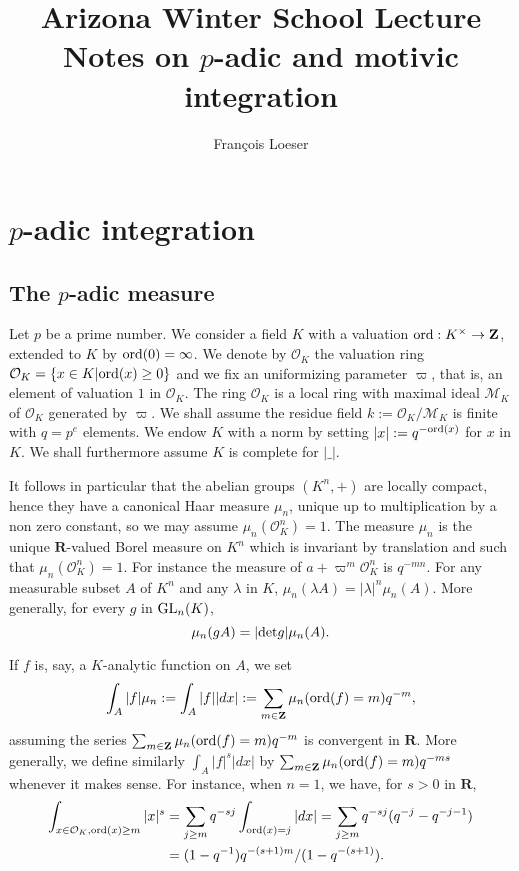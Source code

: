 \documentclass[english,12pt]{amsart}
\author{Fran\c cois Loeser}
\title[$p$-adic and motivic integration]{Arizona Winter School Lecture Notes on 
$p$-adic and motivic integration}
\def\RR{{\mathbf R}}
\def\ZZ{{\mathbf Z}}
\def\cM{{\mathcal M}}
\def\cO{{\mathcal O}}
\theoremstyle{definition}
\theoremstyle{remark}
\theoremstyle{plain}
\numberwithin{equation}{subsection}
\def\RR{{\mathbf R}}
\def\ZZ{{\mathbf Z}}
\def\cM{{\mathcal M}}
\def\cO{{\mathcal O}}
\def\ord{{\rm ord}}
\begin{document}
\maketitle
\noindent
\setcounter{tocdepth}{1}

\section{$p$-adic integration}

\subsection{The $p$-adic measure}Let $p$ be a prime number.
We consider a field $K$ 
with a valuation $\ord : K^{\times}\rightarrow \ZZ$,
extended to $K$ by $\ord (0) = \infty$.
We denote by $\cO_K$ the valuation ring 
$\cO_K = \{x \in K | \ord (x) \geq 0\}$ and we fix an uniformizing parameter
$\varpi$, that is,  an element of valuation $1$ in $\cO_K$.
The ring $\cO_K$
is a local ring with maximal 
ideal $\cM_K$ of $\cO_K$ generated by $\varpi$.
We shall assume the residue field
$k := \cO_K / \cM_K$ is finite with $q = p^e$ elements.
We endow $K$ with a norm by setting
$|x| := q^{- \ord (x)}$ for $x$ in $K$.
We shall furthermore assume $K$
is complete for $| \_ |$.



It follows in particular that the abelian groups
$(K^n, +)$ are locally compact, hence they have a canonical
Haar measure $\mu_n$, unique up to multiplication by a non zero
constant, so we may  assume $\mu_n (\cO_K^n) = 1$.
The measure  $\mu_n$ is the unique $\RR$-valued Borel measure on
$K^n$
which is invariant by translation and such that $\mu_n (\cO_K^n) = 1$.
For instance the measure of $a + \varpi^m \cO_K^n$ is $q^{- mn}$.
For any measurable subset $A$ of $K^n$ and any $\lambda$ in $K$,
$\mu_n (\lambda A) = \vert \lambda \vert^n \mu_n (A)$. More generally,
for every $g$ in ${\rm GL}_n (K)$, 
\begin{equation}\label{gl}
\mu_n (gA) = \vert {\rm det} g\vert \mu_n (A). 
\end{equation}


If $f$ is, say, a $K$-analytic function on $A$,
we
set 
$$
\int_A \vert f \vert \mu_n := \int_A \vert f \vert \vert dx \vert
:=
\sum_{m \in \ZZ}  \mu_n (\ord (f) = m) q^{-m},
$$
assuming the series $\sum_{m \in \ZZ}  \mu_n (\ord(f) = m) q^{-m}$
is convergent in $\RR$. More generally, we define similarly
$\int_A \vert f \vert^s \vert dx \vert$
by
$\sum_{m \in \ZZ}  \mu_n (\ord (f) = m) q^{-ms}$ whenever it makes sense.
For instance, when $n = 1$,
we have, for $s > 0$ in $\RR$,
\begin{equation}\label{cal}
\begin{split}
\int_{x \in \cO_K, \ord (x) \geq m} \vert x \vert^s &= \sum_{j \geq m} q^{-sj} \int_{\ord (x) = j} \vert dx \vert
= \sum_{j \geq m} q^{-sj} (q^{-j}- q^{-j -1})\\
&=(1 -q^{-1})q^{- (s +1) m} / (1- q^{-( s+ 1)}).\\
\end{split}
\end{equation}
\end{document}
